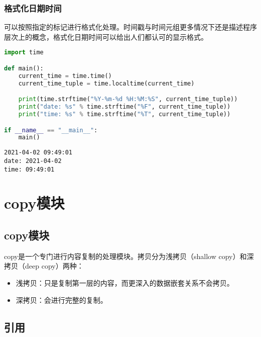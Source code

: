 \subsubsection{格式化日期时间}

可以按照指定的标记进行格式化处理。时间戳与时间元组更多情况下还是描述程序层次上的概念，格式化日期时间可以给出人们都认可的显示格式。\\


\begin{lstlisting}[language=Python]
import time

def main():
    current_time = time.time()
    current_time_tuple = time.localtime(current_time)

    print(time.strftime("%Y-%m-%d %H:%M:%S", current_time_tuple))
    print("date: %s" % time.strftime("%F", current_time_tuple))
    print("time: %s" % time.strftime("%T", current_time_tuple))

if __name__ == "__main__":
    main()
\end{lstlisting}

\begin{tcolorbox}
	\begin{verbatim}
2021-04-02 09:49:01
date: 2021-04-02
time: 09:49:01
\end{verbatim}
\end{tcolorbox}

\newpage

\section{copy模块}

\subsection{copy模块}

copy是一个专门进行内容复制的处理模块。拷贝分为浅拷贝（shallow copy）和深拷贝（deep copy）两种：

\begin{itemize}
	\item 浅拷贝：只是复制第一层的内容，而更深入的数据嵌套关系不会拷贝。
	\item 深拷贝：会进行完整的复制。
\end{itemize}

\vspace{0.5cm}

\subsection{引用}

